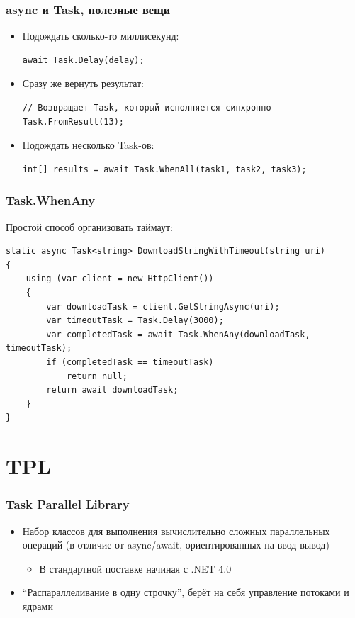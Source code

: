 \documentclass[xetex,mathserif,serif]{beamer}
\begin{document}
	\begin{frame}[fragile]
		\frametitle{async и Task, полезные вещи}
		\begin{itemize}
			\item Подождать сколько-то миллисекунд:
			\begin{verbatim}
await Task.Delay(delay);
			\end{verbatim}

			\item Сразу же вернуть результат:
			\begin{verbatim}
// Возвращает Task, который исполняется синхронно
Task.FromResult(13);
			\end{verbatim}

			\item Подождать несколько Task-ов:
			\begin{verbatim}
int[] results = await Task.WhenAll(task1, task2, task3);
			\end{verbatim}
		\end{itemize}
	\end{frame}

	\begin{frame}[fragile]
		\frametitle{Task.WhenAny}
		Простой способ организовать таймаут:
		\begin{small}
			\begin{verbatim}
static async Task<string> DownloadStringWithTimeout(string uri)
{
    using (var client = new HttpClient())
    {
        var downloadTask = client.GetStringAsync(uri);
        var timeoutTask = Task.Delay(3000);
        var completedTask = await Task.WhenAny(downloadTask, timeoutTask);
        if (completedTask == timeoutTask)
            return null;
        return await downloadTask;
    }
}
			\end{verbatim}
		\end{small}
	\end{frame}

	\section{TPL}

	\begin{frame}
		\frametitle{Task Parallel Library}
		\begin{itemize}
			\item Набор классов для выполнения вычислительно сложных параллельных операций (в отличие от async/await, ориентированных на ввод-вывод)
			\begin{itemize}
				\item В стандартной поставке начиная с .NET 4.0
			\end{itemize}
			\item ``Распараллеливание в одну строчку'', берёт на себя управление потоками и ядрами
		\end{itemize}
	\end{frame}
\end{document}
